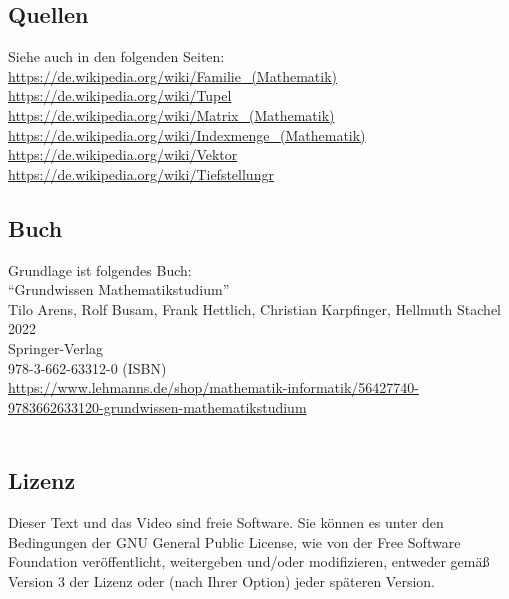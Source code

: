 \documentclass[a4paper]{amsart}
\theoremstyle{definition}
\begin{document}
\subsection*{Quellen}
Siehe auch in den folgenden Seiten:\\
\url{https://de.wikipedia.org/wiki/Familie_(Mathematik)}\\
\url{https://de.wikipedia.org/wiki/Tupel}\\
\url{https://de.wikipedia.org/wiki/Matrix_(Mathematik)}\\
\url{https://de.wikipedia.org/wiki/Indexmenge_(Mathematik)}\\
\url{https://de.wikipedia.org/wiki/Vektor}\\
\url{https://de.wikipedia.org/wiki/Tiefstellungr}

\subsection*{Buch}
Grundlage ist folgendes Buch:\\
"`Grundwissen Mathematikstudium"'\\
Tilo Arens, Rolf Busam, Frank Hettlich, Christian Karpfinger, Hellmuth Stachel \\
2022\\
Springer-Verlag\\
978-3-662-63312-0 (ISBN)\\
{\tiny
   \url{https://www.lehmanns.de/shop/mathematik-informatik/56427740-9783662633120-grundwissen-mathematikstudium}}\\
\\

\subsection*{Lizenz}
Dieser Text und das Video sind freie Software. Sie können es unter den Bedingungen der
GNU General Public License, wie von der Free Software Foundation veröffentlicht, weitergeben
und/oder modifizieren, entweder gemäß Version 3 der Lizenz oder (nach Ihrer Option) jeder späteren Version.
\end{document}
